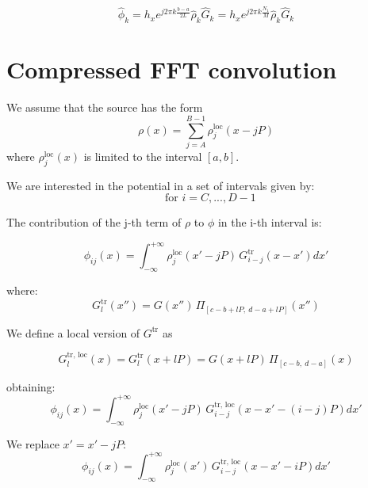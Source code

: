 \begin{equation}
\hat{\phi}_k  = 
h_x e^{j2\pi k \frac{b-a}{2L}} 
\hat{\rho}_k \hat{G}_k
=
h_x e^{j2\pi k \frac{N_1}{M}} 
\hat{\rho}_k \hat{G}_k
\end{equation}

\section{Compressed FFT convolution}

We assume that the source has the form
\begin{equation}
\rho(x) =  \sum_{j=A}^{B-1} \rho^\text{loc}_j(x - jP)
\label{eq:rholim_period}
\end{equation}
where $\rho^\text{loc}_j(x)$ is limited to the interval $[a, b]$.

We are interested in the potential in a set of intervals given by:
\begin{equation}
[c+iP,~d+iP]~~\text{ for } i=C, ... , D-1
\end{equation}

The contribution of the j-th term of $\rho$ to  $\phi$ in the i-th interval is:

\begin{equation}
\phi_{ij}(x) = 
\int_{-\infty}^{+\infty} 
\rho^\text{loc}_j(x' - jP)\,G^\text{tr}_{i-j}(x-x') dx'
\end{equation}

where:
\begin{equation}
G^\text{tr}_l(x'') = G(x'')\,
\Pi_{[c-b+lP,~d-a+lP]}
\left(
{x''}
\right)
\end{equation}

We define a local version of $G^\text{tr}$ as

\begin{equation}
G^\text{tr, loc}_l(x) = G^\text{tr}_l(x + lP) 
=
G(x +lP)\,
\Pi_{[c-b,~d-a]}
\left(x\right)
\end{equation}

obtaining:
\begin{equation}
\phi_{ij}(x) = 
\int_{-\infty}^{+\infty} 
\rho^\text{loc}_j(x' - jP)\,G^\text{tr, loc}_{i-j}(x-x'-(i-j)P) dx'
\end{equation}

We replace $x' = x' - jP$:
\begin{equation}
\phi_{ij}(x) = 
\int_{-\infty}^{+\infty} 
\rho^\text{loc}_j(x')\,G^\text{tr, loc}_{i-j}(x-x' - iP) dx'
\end{equation}

